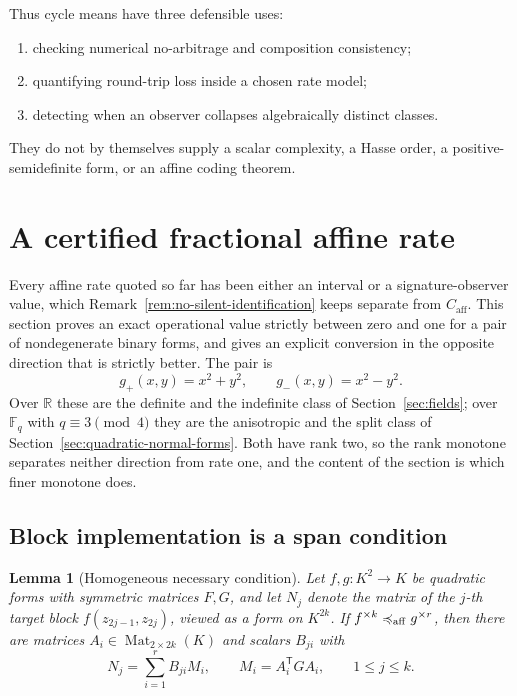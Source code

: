 \documentclass[11pt]{article}
\theoremstyle{definition}
\theoremstyle{plain}
\newtheorem{lemma}[definition]{Lemma}
\theoremstyle{remark}
\newcommand{\F}{\mathbb F}
\newcommand{\R}{\mathbb R}
\newcommand{\impl}{\preccurlyeq}
\newcommand{\caff}{C_{\mathrm{aff}}}
\begin{document}
Thus cycle means have three defensible uses:
\begin{enumerate}
  \item checking numerical no-arbitrage and composition consistency;
  \item quantifying round-trip loss inside a chosen rate model;
  \item detecting when an observer collapses algebraically distinct classes.
\end{enumerate}
They do not by themselves supply a scalar complexity, a Hasse order, a
positive-semidefinite form, or an affine coding theorem.

\section{A certified fractional affine rate}
\label{sec:definite-hyperbolic}

Every affine rate quoted so far has been either an interval or a
signature-observer value, which Remark~\ref{rem:no-silent-identification}
keeps separate from \(\caff\).  This section proves an exact operational value
strictly between zero and one for a pair of nondegenerate binary forms, and
gives an explicit conversion in the opposite direction that is strictly
better.  The pair is
\[
  g_+(x,y)=x^2+y^2,
  \qquad
  g_-(x,y)=x^2-y^2 .
\]
Over \(\R\) these are the definite and the indefinite class of
Section~\ref{sec:fields}; over \(\F_q\) with \(q\equiv3\pmod4\) they are the
anisotropic and the split class of Section~\ref{sec:quadratic-normal-forms}.
Both have rank two, so the rank monotone separates neither direction from
rate one, and the content of the section is which finer monotone does.

\subsection{Block implementation is a span condition}

\begin{lemma}[Homogeneous necessary condition]
\label{lem:span-condition}
Let \(f,g\colon K^2\to K\) be quadratic forms with symmetric matrices \(F,G\),
and let \(N_j\) denote the matrix of the \(j\)-th target block
\(f(z_{2j-1},z_{2j})\), viewed as a form on \(K^{2k}\).  If
\(f^{\times k}\impl_{\rm aff}g^{\times r}\), then there are matrices
\(A_i\in\operatorname{Mat}_{2\times2k}(K)\) and scalars \(B_{ji}\) with
\begin{equation}
  N_j=\sum_{i=1}^{r}B_{ji}M_i,
  \qquad
  M_i=A_i^{\mathsf T}GA_i,
  \qquad
  1\le j\le k.
  \label{eq:span-condition}
\end{equation}
\end{lemma}
\end{document}
